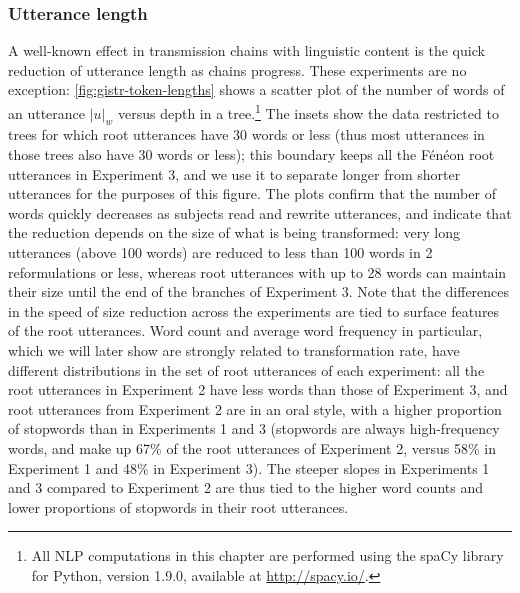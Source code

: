 \subsubsection{Utterance length}\label{utterance-length}

A well-known effect in transmission chains with linguistic content is
the quick reduction of utterance length as chains progress. These
experiments are no exception: \cref{fig:gistr-token-lengths} shows a
scatter plot of the number of words of an utterance \(|u|_w\) versus
depth in a tree.\footnote{All NLP computations in this chapter are
  performed using the spaCy library for Python, version 1.9.0, available
  at \url{http://spacy.io/}.} The insets show the data restricted to
trees for which root utterances have 30 words or less (thus most
utterances in those trees also have 30 words or less); this boundary
keeps all the Fénéon root utterances in Experiment 3, and we use it to
separate longer from shorter utterances for the purposes of this figure.
The plots confirm that the number of words quickly decreases as subjects
read and rewrite utterances, and indicate that the reduction depends on
the size of what is being transformed: very long utterances (above 100
words) are reduced to less than 100 words in 2 reformulations or less,
whereas root utterances with up to 28 words can maintain their size
until the end of the branches of Experiment 3. Note that the differences
in the speed of size reduction across the experiments are tied to
surface features of the root utterances. Word count and average word
frequency in particular, which we will later show are strongly related
to transformation rate, have different distributions in the set of root
utterances of each experiment: all the root utterances in Experiment 2
have less words than those of Experiment 3, and root utterances from
Experiment 2 are in an oral style, with a higher proportion of stopwords
than in Experiments 1 and 3 (stopwords are always high-frequency words,
and make up 67\% of the root utterances of Experiment 2, versus 58\% in
Experiment 1 and 48\% in Experiment 3). The steeper slopes in
Experiments 1 and 3 compared to Experiment 2 are thus tied to the higher
word counts and lower proportions of stopwords in their root utterances.

